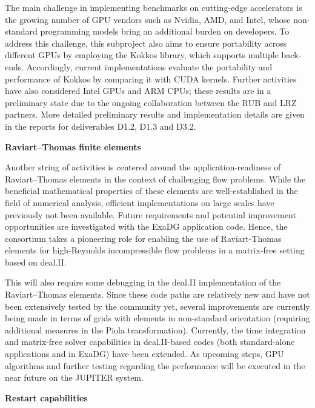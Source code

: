 \documentclass[a4paper,12pt, numbers]{article}
\begin{document}
The main challenge in implementing benchmarks on cutting-edge accelerators is the growing number of GPU vendors such as Nvidia, AMD, and Intel, whose non-standard programming models bring an additional burden on developers. To address this challenge, this subproject also aims to ensure portability across different GPUs by employing the Kokkos library, which supports multiple back-ends. Accordingly, current implementations evaluate the portability and performance of Kokkos by comparing it with CUDA kernels.
Further activities have also considered Intel GPUs and ARM CPUs; these results are in a preliminary state due to the ongoing collaboration between the RUB
and LRZ partners. More detailed preliminary results and implementation details are given in the reports for deliverables D1.2, D1.3 and D3.2.

\noindent\textbf{Raviart--Thomas finite elements}

Another string of activities is centered around the application-readiness of
Raviart--Thomas elements in the context of challenging flow problems. While
the beneficial mathematical properties of these elements are well-established
in the field of numerical analysis, efficient implementations on large scales
have previously not been available. Future requirements and potential
improvement opportunities are investigated with the ExaDG application code.
Hence, the consortium takes a pioneering role for enabling the use of
Raviart-Thomas elements for high-Reynolds incompressible flow problems in a
matrix-free setting based on deal.II.

This will also require some debugging in the deal.II implementation of the
Raviart--Thomas elements. Since these code paths are relatively new and have
not been extensively tested by the community yet, several improvements are
currently being made in terms of grids with elements in non-standard
orientation (requiring additional measures in the Piola
transformation). Currently, the time integration and matrix-free solver
capabilities in deal.II-based codes (both standard-alone applications and in
ExaDG) have been extended. As upcoming steps, GPU algorithms and further
testing regarding the performance will be executed in the near future on the
JUPITER system.

\noindent\textbf{Restart capabilities}
\end{document}
